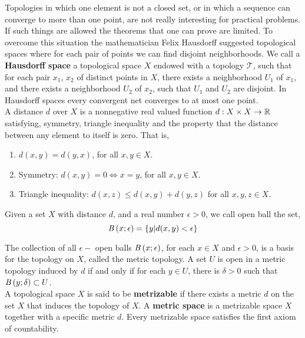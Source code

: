 Topologies in which one element is not a closed set, or in which a sequence can converge to more than one point, are not really interesting for practical problems. If such things are allowed the theorems that one can prove are limited. To overcome this situation the mathematician Felix Hausdorff suggested topological spaces where for each pair of points we can find disjoint neighborhoods. We call a \textbf{Hausdorff space} a topological space $X$ endowed with a topology $\mathcal{T}$, such that for each pair $x_1$, $x_2$ of distinct points in $X$, there exists a neighborhood $U_1$ of $x_1$, and there exists a neighborhood $U_2$ of $x_2$, such that $U_1$ and $U_2$ are disjoint.  In Hausdorff spaces every convergent net converges to at most one point. 
\\

A distance $d$ over $X$ is a nonnegative real valued function $d:X\times X\rightarrow \mathbb{R}$ satisfying, symmetry, triangle inequality and the property that the distance between any element to itself is zero. That is,
\begin{enumerate}
	\item $d(x, y)=d(y,x)$, for all $x,y \in X$.
	\item Symmetry: $d(x,y)=0 \iff x=y$, for all $x,y \in X$. 
	\item Triangle inequality: $d(x,z)\leq d(x,y)+d(y,z)$ for all $x,y,z\in X$.
\end{enumerate}
Given a set $X$ with distance $d$, and a real number $\epsilon >0$, we call open ball the set,
\begin{equation*}
	\mathit{B}\left( x; \epsilon \right)=\left\lbrace y| d(x,y)<\epsilon \right\rbrace
\end{equation*} 

The collection of all $\epsilon-$ open balls $\mathit{B}\left( x; \epsilon \right)$, for each $x\in X$ and $\epsilon>0$, is a basis for the topology on $X$, called the metric topology. A set $U$ is open in a metric topology induced by $d$ if and only if for each $y\in U$, there is $\delta>0$ such that $\mathit{B}\left( y; \delta \right)\subset U$.\\

A topological space $X$ is said to be \textbf{metrizable} if there exists a metric $d$ on the set $X$ that induces the topology of $X$. A \textbf{metric space} is a metrizable space $X$ together with a specific metric $d$. Every metrizable space satisfies the first axiom of countability.\\

